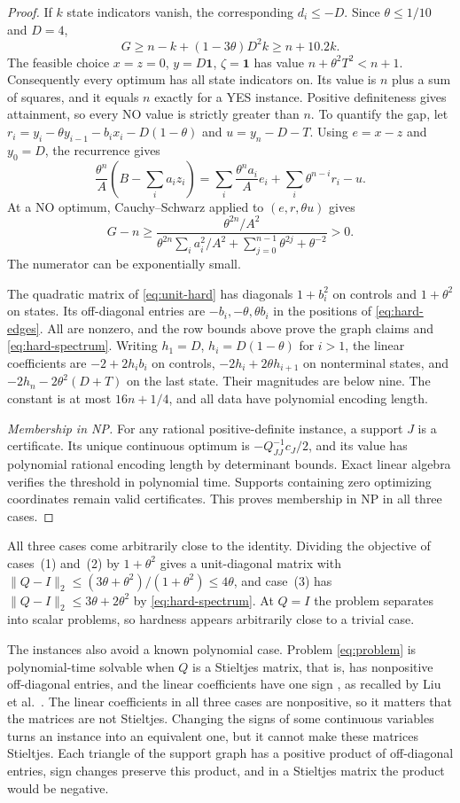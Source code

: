 \begin{proof}
If $k$ state indicators vanish, the corresponding $d_i\le-D$. Since
$\theta\le1/10$ and $D=4$,
\[
 G\ge n-k+(1-3\theta)D^2k\ge n+10.2k.
\]
The feasible choice $x=z=0$, $y=D\mathbf1$, $\zeta=\mathbf1$ has
value $n+\theta^2T^2<n+1$. Consequently every optimum has all state
indicators on. Its value is $n$ plus a sum of squares, and it equals $n$
exactly for a YES instance. Positive definiteness gives attainment, so
every NO value is strictly greater than $n$.
To quantify the gap, let
$r_i=y_i-\theta y_{i-1}-b_ix_i-D(1-\theta)$ and $u=y_n-D-T$.
Using $e=x-z$ and $y_0=D$, the recurrence gives
\[
 \frac{\theta^n}{A}\left(B-\sum_i a_i z_i\right)
 =\sum_i\frac{\theta^n a_i}{A}e_i
       +\sum_i\theta^{n-i}r_i-u.
\]
At a NO optimum, Cauchy--Schwarz applied to $(e,r,\theta u)$ gives
\[
 G-n\ge\frac{\theta^{2n}/A^2}
 {\theta^{2n}\sum_i a_i^2/A^2+
       \sum_{j=0}^{n-1}\theta^{2j}+\theta^{-2}}>0.
\]
The numerator can be exponentially small.

The quadratic matrix of \eqref{eq:unit-hard} has diagonals $1+b_i^2$ on
controls and $1+\theta^2$ on states. Its off-diagonal entries are
$-b_i,-\theta,\theta b_i$ in the positions of \eqref{eq:hard-edges}.
All are nonzero, and the row bounds above prove the graph claims and
\eqref{eq:hard-spectrum}.
Writing $h_1=D$, $h_i=D(1-\theta)$ for $i>1$, the linear coefficients are
$-2+2h_i b_i$ on controls, $-2h_i+2\theta h_{i+1}$ on nonterminal states,
and $-2h_n-2\theta^2(D+T)$ on the last state. Their magnitudes are below
nine. The constant is at most $16n+1/4$, and all data have polynomial
encoding length.

\emph{Membership in NP.} For any rational positive-definite instance, a
support $J$ is a certificate. Its unique continuous optimum is
$-Q_{JJ}^{-1}c_J/2$, and its value has polynomial rational encoding
length by determinant bounds. Exact linear algebra verifies the
threshold in polynomial time. Supports containing zero optimizing
coordinates remain valid certificates. This proves membership in NP in
all three cases.
\end{proof}

All three cases come arbitrarily close to the identity. Dividing the
objective of cases~(1) and~(2) by $1+\theta^2$ gives a unit-diagonal
matrix with $\|Q-I\|_2\le(3\theta+\theta^2)/(1+\theta^2)\le4\theta$,
and case~(3) has $\|Q-I\|_2\le3\theta+2\theta^2$ by
\eqref{eq:hard-spectrum}. At $Q=I$ the problem separates into scalar
problems, so hardness appears arbitrarily close to a trivial case.

The instances also avoid a known polynomial case. Problem
\eqref{eq:problem} is polynomial-time solvable when $Q$ is a Stieltjes
matrix, that is, has nonpositive off-diagonal entries, and the linear
coefficients have one sign \cite{AtamturkGomezM}, as recalled by
Liu et al.~\cite{LiuStieltjes}. The linear coefficients in all three
cases are nonpositive, so it matters that the matrices are not
Stieltjes. Changing the signs of some continuous variables turns an
instance into an equivalent one, but it cannot make these matrices
Stieltjes. Each triangle of the support graph has a positive product of
off-diagonal entries, sign changes preserve this product, and in a
Stieltjes matrix the product would be negative.

